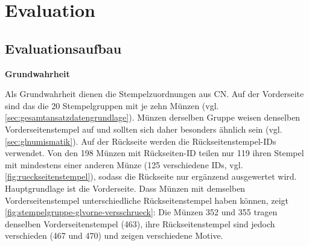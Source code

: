 
\chapter{Evaluation}\label{ch:evaluation}
\glsresetall %

\section{Evaluationsaufbau}
\label{sec:evaluationsaufbau}
\noindent \textbf{Grundwahrheit}

\noindent Als Grundwahrheit dienen die Stempelzuordnungen aus CN. Auf der Vorderseite sind das die 20 Stempelgruppen mit je zehn Münzen (vgl. \cref{sec:gesamtansatzdatengrundlage}). Münzen derselben Gruppe weisen denselben Vorderseitenstempel auf und sollten sich daher besonders ähnlich sein (vgl. \cref{sec:glnumismatik}). Auf der Rückseite werden die Rückseitenstempel-IDs verwendet. Von den 198 Münzen mit Rückseiten-ID teilen nur 119 ihren Stempel mit mindestens einer anderen Münze (125 verschiedene IDs, vgl. \cref{fig:rueckseitenstempel}), sodass die Rückseite nur ergänzend ausgewertet wird. Hauptgrundlage ist die Vorderseite. Dass Münzen mit demselben Vorderseitenstempel unterschiedliche Rückseitenstempel haben können, zeigt \cref{fig:stempelgruppe-glvorne-versschrueck}: Die Münzen 352 und 355 tragen denselben Vorderseitenstempel (463), ihre Rückseitenstempel sind jedoch verschieden (467 und 470) und zeigen verschiedene Motive. 


